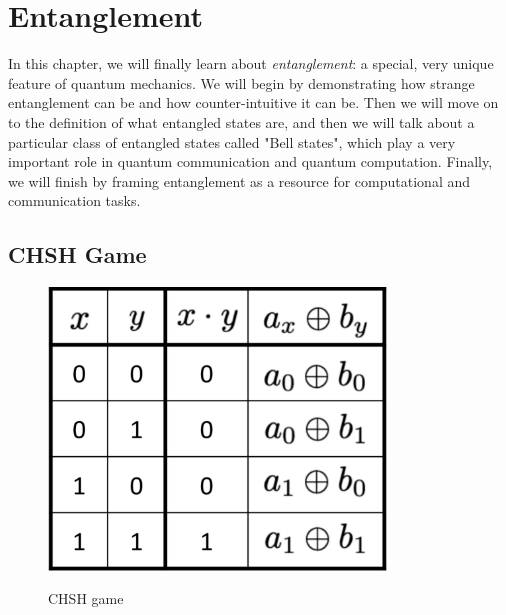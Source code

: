\chapter{Entanglement}


In this chapter, we will finally learn about \emph{entanglement}: a special, very unique feature of quantum mechanics. We will begin by demonstrating how strange entanglement can be and how counter-intuitive it can be. Then we will move on to the definition of what entangled states are, and then we will talk about a particular class of entangled states called "Bell states", which play a very important role in quantum communication and quantum computation. Finally, we will finish by framing entanglement as a resource for computational and communication tasks.


\section{CHSH Game}
\label{sec:chsh-game}

\begin{figure}[H]
    \centering
    \includegraphics[width=0.8\textwidth]{lesson4/CHSH_table.pdf}
    \label{fig: 1}
    
        \caption{CHSH game}
    
\end{figure}
\fi



